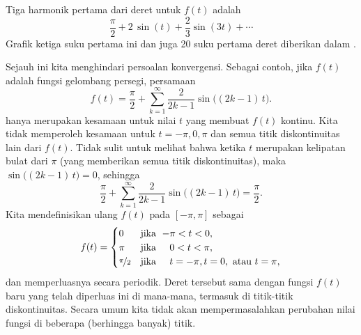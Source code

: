\begin{example}
Tiga harmonik pertama dari deret untuk $f(t)$ adalah
\begin{equation*}
\frac{\pi}{2}
+
2 \, \sin (t)
+
\frac{2}{3}  \sin (3t)
+ \cdots
\end{equation*}
Grafik ketiga suku pertama ini dan juga 20 suku pertama deret
diberikan dalam
.

\begin{myfig}
\capstart
\caption{Tiga harmonik pertama (grafik kiri) dan 20 harmonik pertama (grafik kanan) dari
fungsi gelombang persegi.\label{ts:squarewavefsfig}}
\end{myfig}
\end{example}

Sejauh ini kita menghindari persoalan konvergensi.  Sebagai contoh,
jika $f(t)$ adalah fungsi gelombang persegi,
persamaan
\begin{equation*}
f(t) = 
\frac{\pi}{2} + \sum_{k=1}^\infty
\frac{2}{2k-1} 
\sin \bigl( (2k-1)\, t \bigr) .
\end{equation*}
hanya merupakan kesamaan untuk nilai $t$ yang membuat $f(t)$ kontinu.
Kita tidak memperoleh kesamaan untuk $t=-\pi,0,\pi$ dan semua titik diskontinuitas
lain dari $f(t)$.  Tidak sulit untuk melihat bahwa ketika $t$ merupakan kelipatan bulat dari
$\pi$ (yang memberikan semua titik diskontinuitas), maka
$\sin \bigl( (2k-1)\, t \bigr) = 0$, sehingga
\begin{equation*}
\frac{\pi}{2} + \sum_{k=1}^\infty
\frac{2}{2k-1} 
\sin \bigl( (2k-1)\, t \bigr) = \frac{\pi}{2} .
\end{equation*}
Kita mendefinisikan ulang $f(t)$ pada $[-\pi,\pi]$ sebagai
\begin{equation*}
f(t) =
\begin{cases}
0 & \text{jika } \; {-\pi} < t < 0 , \\
\pi & \text{jika } \; \phantom{-}0 < t < \pi , \\
\nicefrac{\pi}{2} & \text{jika } \; \phantom{-}t = -\pi, 
t = 0,\text{ atau }
t = \pi,
\end{cases}
\end{equation*}
dan memperluasnya secara periodik.
Deret tersebut sama dengan fungsi $f(t)$ baru yang telah diperluas ini di mana-mana, termasuk di
titik-titik diskontinuitas.
Secara umum kita tidak akan mempermasalahkan perubahan nilai fungsi
di beberapa (berhingga banyak) titik.

